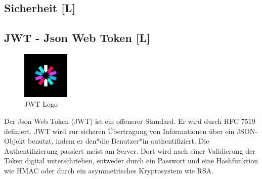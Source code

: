 \subsection{Sicherheit [L]}

\subsection{JWT - Json Web Token [L]}
\begin{figure}
  \begin{center}
    \includegraphics[width=0.2\textwidth]{pics/jwt_logo.png}
   \caption{JWT Logo}
  \end{center}
\end{figure}
Der Json Web Token (JWT) ist ein offenerer Standard. Er wird durch RFC 7519 definiert. JWT wird zur sicheren Übertragung von Informationen über ein JSON-Objekt benutzt, indem er den*die Benutzer*in authentifiziert. Die Authentifizierung passiert meist am Server. Dort wird nach einer Validierung der Token digital unterschrieben, entweder durch ein Passwort und eine Hashfunktion wie HMAC oder durch ein asymmetrisches Kryptosystem wie RSA. \cite{jwtAuth0}


